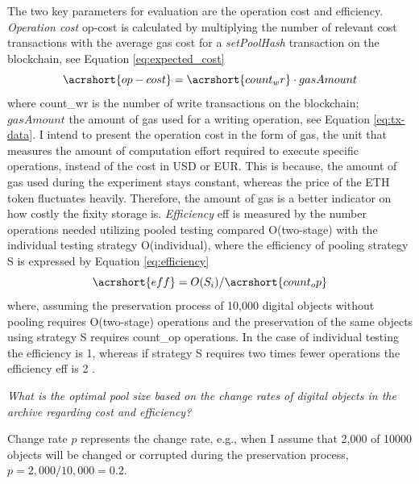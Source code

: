 The two key parameters for evaluation are the operation cost and efficiency. 
\textit{Operation cost} \acrshort{op-cost} is calculated by multiplying the number of relevant cost transactions with the average gas cost for a \textit{setPoolHash} transaction on the blockchain, see Equation \ref{eq:expected_cost}
\begin{equation}\label{eq:expected_cost}
    \acrshort{op-cost} = \acrshort{count_wr} \cdot gasAmount
\end{equation}
where \acrshort{count_wr} is the number of write transactions on the blockchain; $gasAmount$ the amount of gas used for a writing operation, see Equation \ref{eq:tx-data}.
I intend to present the operation cost in the form of gas, the unit that measures the amount of computation effort required to execute specific operations, instead of the cost in USD or EUR. This is because, the amount of gas used during the experiment stays constant, whereas the price of the ETH token fluctuates heavily. Therefore, the amount of gas is a better indicator on how costly the fixity storage is.
\textit{Efficiency} \acrshort{eff} is measured by the number operations needed utilizing pooled testing compared O(\acrshort{two-stage}) with the individual testing strategy O(\acrshort{individual}), where the efficiency of pooling strategy S is expressed by Equation \ref{eq:efficiency}
\begin{equation}\label{eq:efficiency}
    \acrshort{eff} = O(S_{i})/\acrshort{count_op}
\end{equation}
where, assuming the preservation process of 10,000 digital objects without pooling requires O(\acrshort{two-stage}) operations and the preservation of the same objects using strategy S requires \acrshort{count_op} operations. In the case of individual testing the efficiency is 1, whereas if strategy S requires two times fewer operations the efficiency \acrshort{eff} is 2 \cite[4]{vzilinskas2021pooled}.

\textit{What is the optimal pool size based on the change rates of digital objects in the archive regarding cost and efficiency?}

Change rate $p$ represents the change rate, e.g., when I assume that 2,000 of 10000 objects will be changed or corrupted during the preservation process, $p = 2,000/10,000 = 0.2$. 

